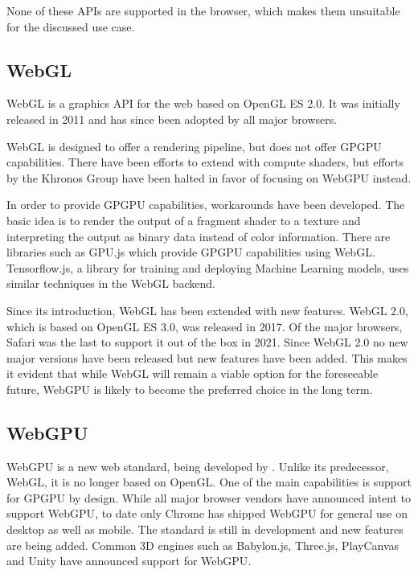 None of these \glspl{API} are supported in the browser, which makes them unsuitable for the discussed use case.

\subsection*{WebGL}

\gls{WebGL} is a graphics \gls{API} for the web based on \gls{OpenGL ES} 2.0. It was initially released in 2011 and has since been adopted by all major browsers.

\gls{WebGL} is designed to offer a rendering pipeline, but does not offer \gls{GPGPU} capabilities. There have been efforts to extend with compute shaders, but efforts by the \gls{Khronos Group} have been halted in favor of focusing on \gls{WebGPU} instead.

In order to provide \gls{GPGPU} capabilities, workarounds have been developed. The basic idea is to render the output of a fragment shader to a texture and interpreting the output as binary data instead of color information.
There are libraries such as GPU.js which provide \gls{GPGPU} capabilities using \gls{WebGL}. Tensorflow.js, a library for training and deploying Machine Learning models, uses similar techniques in the \gls{WebGL} backend.

Since its introduction, \gls{WebGL} has been extended with new features. \gls{WebGL} 2.0, which is based on \gls{OpenGL ES} 3.0, was released in 2017. Of the major browsers, Safari was the last to support it out of the box in 2021. Since \gls{WebGL} 2.0 no new major versions have been released but new features have been added. This makes it evident that while \gls{WebGL} will remain a viable option for the foreseeable future, \gls{WebGPU} is likely to become the preferred choice in the long term.

\subsection*{WebGPU}

\gls{WebGPU} is a new web standard, being developed by  \cite{webgpuSpecification}. Unlike its predecessor, \gls{WebGL}, it is no longer based on \gls{OpenGL}. One of the main capabilities is support for \gls{GPGPU} by design. While all major browser vendors have announced intent to support \gls{WebGPU}, to date only Chrome has shipped \gls{WebGPU} for general use on desktop as well as mobile.
The standard is still in development and new features are being added.
Common 3D engines such as \gls{Babylon.js}, \gls{Three.js}, \gls{PlayCanvas} and \gls{Unity} have announced support for \gls{WebGPU}.

